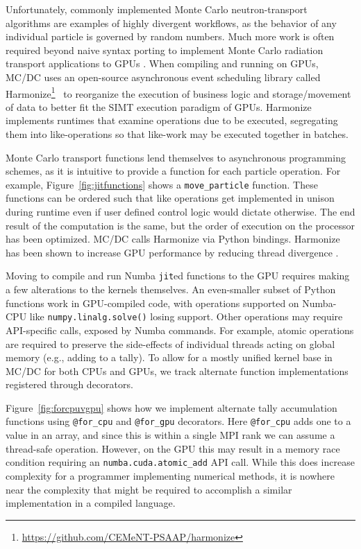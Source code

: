 Unfortunately, commonly implemented Monte Carlo neutron-transport algorithms are examples of highly divergent workflows, as the behavior of any individual particle is governed by random numbers.
Much more work is often required beyond naive syntax porting to implement Monte Carlo radiation transport applications to GPUs \cite{pozulp_progress_2023}.
When compiling and running on GPUs, MC/DC uses an open-source asynchronous event scheduling library called Harmonize\footnote{\url{https://github.com/CEMeNT-PSAAP/harmonize}}~\cite{brax2023} to 
reorganize the execution of business logic and storage/movement of data to better fit the SIMT execution paradigm of GPUs.
Harmonize implements runtimes that examine operations due to be executed, segregating them into like-operations so that like-work may be executed together in batches.

Monte Carlo transport functions lend themselves to asynchronous programming schemes, as it is intuitive to provide a function for each particle operation.
For example, Figure~\ref{fig:jitfunctions} shows a \texttt{move\_particle} function.
These functions can be ordered such that like operations get implemented in unison during runtime even if user defined control logic would dictate otherwise.
The end result of the computation is the same, but the order of execution on the processor has been optimized.
MC/DC calls Harmonize via Python bindings.
Harmonize has been shown to increase GPU performance by reducing thread divergence \cite{brax2023}.



Moving to compile and run Numba \texttt{jit}ed functions to the GPU requires making a few alterations to the kernels themselves.
An even-smaller subset of Python functions work in GPU-compiled code, with operations supported on Numba-CPU like \texttt{numpy.linalg.solve()} losing support.
Other operations may require API-specific calls, exposed by Numba commands.
For example, atomic operations are required to preserve the side-effects of individual threads acting on global memory (e.g., adding to a tally).
To allow for a mostly unified kernel base in MC/DC for both CPUs and GPUs, we track alternate function implementations registered through decorators.

Figure~\ref{fig:forcpuvgpu} shows how we implement alternate tally accumulation functions using \texttt{@for\_cpu} and \texttt{@for\_gpu} decorators.
Here \texttt{@for\_cpu} adds one to a value in an array, and since this is within a single MPI rank we can assume a thread-safe operation.
However, on the GPU this may result in a memory race condition requiring an \texttt{numba.cuda.atomic\_add} API call.
While this does increase complexity for a programmer implementing numerical methods, it is nowhere near the complexity that might be required to accomplish a similar implementation in a compiled language.

